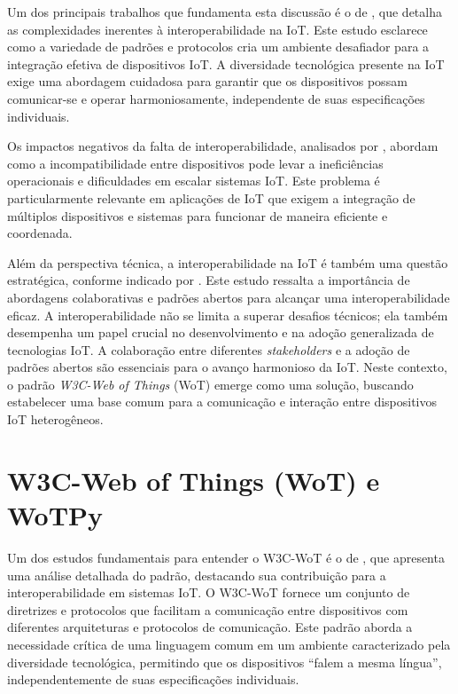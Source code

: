 Um dos principais trabalhos que fundamenta esta discussão é o de \cite{Miorandi2012}, que detalha as complexidades inerentes à interoperabilidade na IoT. Este estudo esclarece como a variedade de padrões e protocolos cria um ambiente desafiador para a integração efetiva de dispositivos IoT. A diversidade tecnológica presente na IoT exige uma abordagem cuidadosa para garantir que os dispositivos possam comunicar-se e operar harmoniosamente, independente de suas especificações individuais.

Os impactos negativos da falta de interoperabilidade, analisados por \cite{Atzori2010}, abordam como a incompatibilidade entre dispositivos pode levar a ineficiências operacionais e dificuldades em escalar sistemas IoT. Este problema é particularmente relevante em aplicações de IoT que exigem a integração de múltiplos dispositivos e sistemas para funcionar de maneira eficiente e coordenada.


Além da perspectiva técnica, a interoperabilidade na IoT é também uma questão estratégica, conforme indicado por \cite{Kortuem2010}. Este estudo ressalta a importância de abordagens colaborativas e padrões abertos para alcançar uma interoperabilidade eficaz. A interoperabilidade não se limita a superar desafios técnicos; ela também desempenha um papel crucial no desenvolvimento e na adoção generalizada de tecnologias IoT. A colaboração entre diferentes \textit{stakeholders} e a adoção de padrões abertos são essenciais para o avanço harmonioso da IoT. Neste contexto, o padrão \textit{W3C-Web of Things} (WoT) emerge como uma solução, buscando estabelecer uma base comum para a comunicação e interação entre dispositivos IoT heterogêneos.

\section{W3C-Web of Things (WoT) e WoTPy}

Um dos estudos fundamentais para entender o W3C-WoT é o de \cite{Kovatsch2023}, que apresenta uma análise detalhada do padrão, destacando sua contribuição para a interoperabilidade em sistemas IoT. O W3C-WoT fornece um conjunto de diretrizes e protocolos que facilitam a comunicação entre dispositivos com diferentes arquiteturas e protocolos de comunicação. Este padrão aborda a necessidade crítica de uma linguagem comum em um ambiente caracterizado pela diversidade tecnológica, permitindo que os dispositivos ``falem a mesma língua'', independentemente de suas especificações individuais.


